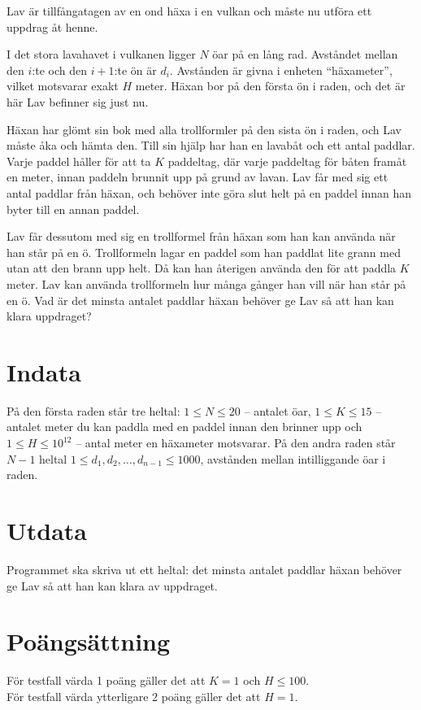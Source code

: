 Lav är tillfångatagen av en ond häxa i en vulkan och måste nu utföra ett uppdrag åt henne.

I det stora lavahavet i vulkanen ligger $N$ öar på en lång rad.
Avståndet mellan den $i$:te och den $i+1$:te ön är $d_i$. Avstånden är givna i enheten ``häxameter'', vilket motsvarar exakt $H$ meter.  
Häxan bor på den första ön i raden, och det är här Lav befinner sig just nu.

Häxan har glömt sin bok med alla trollformler på den sista ön i raden, och Lav måste åka och hämta den. Till sin hjälp har han en lavabåt och ett antal paddlar. 
Varje paddel håller för att ta $K$ paddeltag, där varje paddeltag för båten framåt en meter, innan paddeln brunnit upp på grund av lavan.
Lav får med sig ett antal paddlar från häxan, och behöver inte göra slut helt på en paddel innan han byter till en annan paddel.

Lav får dessutom med sig en trollformel från häxan som han kan använda när han står på en ö. Trollformeln lagar en paddel som han paddlat lite grann med utan att den brann upp helt.
Då kan han återigen använda den för att paddla $K$ meter.
Lav kan använda trollformeln hur många gånger han vill när han står på en ö.
Vad är det minsta antalet paddlar häxan behöver ge Lav så att han kan klara uppdraget?

\section*{Indata}
På den första raden står tre heltal: $1 \le N \le 20$ -- antalet öar, $1 \le K \le 15$ -- antalet meter du kan paddla med en paddel innan den brinner upp och $1 \le H \le 10^{12}$ -- antal meter en häxameter motsvarar.
På den andra raden står $N-1$ heltal $1 \le d_1, d_2, \dots, d_{n-1} \le 1000$, avstånden mellan intilliggande öar i raden.

\section*{Utdata}
Programmet ska skriva ut ett heltal: det minsta antalet paddlar häxan behöver ge Lav så att han kan klara av uppdraget.

\section*{Poängsättning}
För testfall värda 1 poäng gäller det att $K=1$ och $H\le 100$. \\
För testfall värda ytterligare 2 poäng gäller det att $H=1$.

